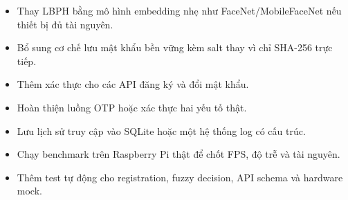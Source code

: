 \begin{itemize}
    \item Thay LBPH bằng mô hình embedding nhẹ như FaceNet/MobileFaceNet nếu thiết bị đủ tài nguyên.
    \item Bổ sung cơ chế lưu mật khẩu bền vững kèm salt thay vì chỉ SHA-256 trực tiếp.
    \item Thêm xác thực cho các API đăng ký và đổi mật khẩu.
    \item Hoàn thiện luồng OTP hoặc xác thực hai yếu tố thật.
    \item Lưu lịch sử truy cập vào SQLite hoặc một hệ thống log có cấu trúc.
    \item Chạy benchmark trên Raspberry Pi thật để chốt FPS, độ trễ và tài nguyên.
    \item Thêm test tự động cho registration, fuzzy decision, API schema và hardware mock.
\end{itemize}

\clearpage
